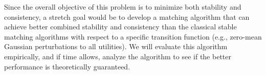 \documentclass{article}
\begin{document}
Since the overall objective of this problem is to minimize both stability and consistency, a stretch goal would be to develop a matching algorithm that can achieve better combined stability and consistency than the classical stable matching algorithms with respect to a specific transition function (e.g., zero-mean Gaussian perturbations to all utilities). We will evaluate this algorithm empirically, and if time allows, analyze the algorithm to see if the better performance is theoretically guaranteed.




\end{document}
